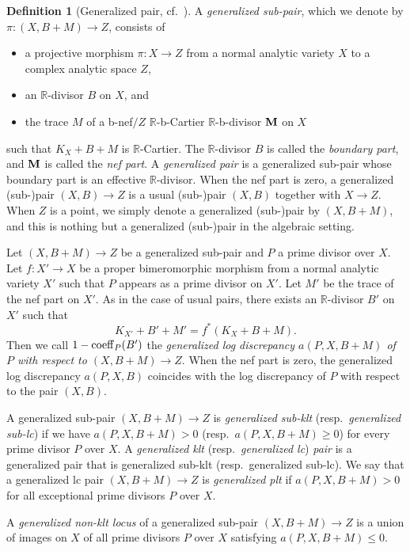 \documentclass[12pt]{amsart}
\theoremstyle{definition}
\newtheorem{defn}[thm]{Definition}
\begin{document}
\begin{defn}[Generalized pair, {cf.~\cite{bz}}]\label{defn--gen-pair}
A {\em generalized sub-pair}, which we denote by $\pi \colon (X,B+M) \to Z$, consists of 
\begin{itemize}
\item
a projective morphism $\pi \colon X\to Z$ from a normal analytic variety $X$ to a complex analytic space $Z$, 
\item
an $\mathbb{R}$-divisor $B$ on $X$, and
\item
the trace $M$ of a b-nef$/Z$ $\mathbb{R}$-b-Cartier $\mathbb{R}$-b-divisor $\boldsymbol{\rm M}$ on $X$
\end{itemize}
such that $K_{X}+B+M$ is $\mathbb{R}$-Cartier. 
The $\mathbb{R}$-divisor $B$ is called the {\em boundary part}, and $\boldsymbol{\rm M}$ is called the {\em nef part}. 
A {\em generalized pair} is a generalized sub-pair whose boundary part is an effective $\mathbb{R}$-divisor. 
When the nef part is zero, a generalized (sub-)pair $(X,B) \to Z$ is a usual (sub-)pair $(X,B)$ together with $X\to Z$. 
When $Z$ is a point, we simply denote a generalized (sub-)pair by $(X,B+M)$, and this is nothing but a generalized (sub-)pair in the algebraic setting. 

Let $(X,B+M) \to Z$ be a generalized sub-pair and $P$ a prime divisor over $X$. 
Let $f \colon X' \to X$ be a proper bimeromorphic morphism from a normal analytic variety $X'$ such that $P$ appears as a prime divisor on $X'$. 
Let $M'$ be the trace of the nef part on $X'$. 
As in the case of usual pairs, there exists an $\mathbb{R}$-divisor $B'$ on $X'$ such that
$$K_{X'}+B'+M'=f^{*}(K_{X}+B+M).$$
Then we call $1-{\rm coeff}_{P}(B')$ the {\em generalized log discrepancy $a(P,X,B+M)$ of $P$ with respect to $(X,B+M)\to Z$}. 
When the nef part is zero, the generalized log discrepancy $a(P,X,B)$ coincides with the log discrepancy of $P$ with respect to the pair $(X,B)$. 

A generalized sub-pair $(X,B+M) \to Z$ is {\em generalized sub-klt} (resp.~{\em generalized sub-lc}) if we have $a(P,X,B+M)>0$ (resp.~$a(P,X,B+M)\geq 0$) for every prime divisor $P$ over $X$. 
A {\em generalized klt} (resp.~{\em generalized lc}) {\em pair} is a generalized pair that is generalized sub-klt (resp.~generalized sub-lc). 
We say that a generalized lc pair $(X,B+M) \to Z$ is {\em generalized plt} if $a(P,X,B+M)>0$ for all exceptional prime divisors $P$ over $X$. 

A {\em generalized non-klt locus} of a generalized sub-pair $(X,B+M) \to Z$ is a union of images on $X$ of all prime divisors $P$ over $X$ satisfying $a(P,X,B+M) \leq 0$. 
\end{defn}
\end{document}
